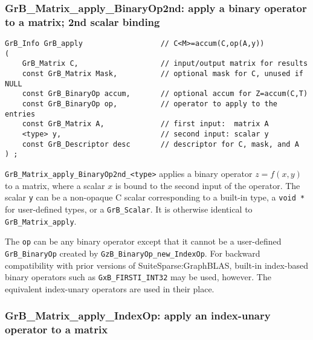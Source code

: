 \documentclass[12pt]{article}
\begin{document}
\subsubsection{{\sf GrB\_Matrix\_apply\_BinaryOp2nd:} apply a binary operator to a matrix; 2nd scalar binding}
\label{matrix_apply2nd}

\begin{mdframed}[userdefinedwidth=6in]
{\footnotesize
\begin{verbatim}
GrB_Info GrB_apply                  // C<M>=accum(C,op(A,y))
(
    GrB_Matrix C,                   // input/output matrix for results
    const GrB_Matrix Mask,          // optional mask for C, unused if NULL
    const GrB_BinaryOp accum,       // optional accum for Z=accum(C,T)
    const GrB_BinaryOp op,          // operator to apply to the entries
    const GrB_Matrix A,             // first input:  matrix A
    <type> y,                       // second input: scalar y
    const GrB_Descriptor desc       // descriptor for C, mask, and A
) ;
\end{verbatim} } \end{mdframed}

\verb'GrB_Matrix_apply_BinaryOp2nd_<type>'  applies a binary operator
$z=f(x,y)$ to a matrix, where a scalar $x$ is bound to the second input of the
operator.
The scalar \verb'y' can be a non-opaque C scalar corresponding to a built-in
type, a \verb'void *' for user-defined types, or a \verb'GrB_Scalar'.
It is otherwise identical to \verb'GrB_Matrix_apply'.

The \verb'op' can be any binary operator except that it cannot be a
user-defined \verb'GrB_BinaryOp' created by \verb'GzB_BinaryOp_new_IndexOp'.
For backward compatibility with prior versions of SuiteSparse:GraphBLAS,
built-in index-based binary operators such as \verb'GxB_FIRSTI_INT32' may be
used, however.  The equivalent index-unary operators are used in their place.

\subsubsection{{\sf GrB\_Matrix\_apply\_IndexOp:} apply an index-unary operator to a matrix}
\label{matrix_apply_idxunop}
\end{document}
